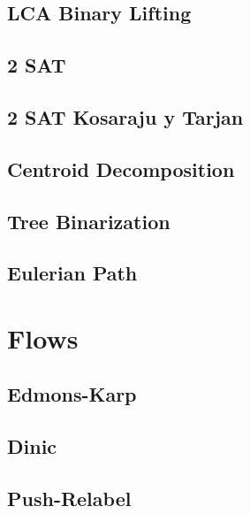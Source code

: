 \subsection{LCA Binary Lifting}
\raggedbottom
\hrulefill
\subsection{2 SAT}
\raggedbottom
\hrulefill
\subsection{2 SAT Kosaraju y Tarjan}
\raggedbottom
\hrulefill
\subsection{Centroid Decomposition}
\raggedbottom
\hrulefill
\subsection{Tree Binarization}
\raggedbottom
\hrulefill
\subsection{Eulerian Path}
\raggedbottom
\hrulefill

\section{Flows}
\subsection{Edmons-Karp}
\raggedbottom
\hrulefill
\subsection{Dinic}
\raggedbottom
\hrulefill
\subsection{Push-Relabel}
\raggedbottom
\hrulefill
